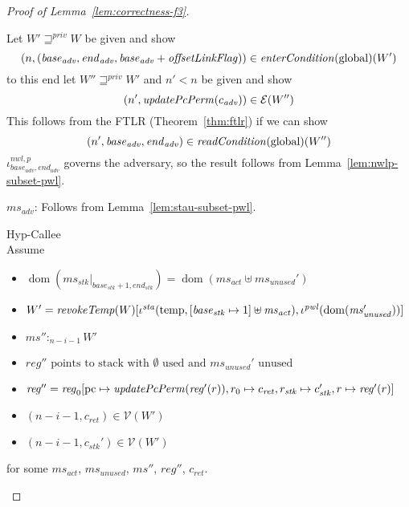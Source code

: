 \documentclass[a4paper]{article}
\DeclareMathOperator{\dom}{dom}
\newcommand{\var}[1]{\mathit{#1}}
\newcommand{\hs}{\var{ms}}
\newcommand{\ms}{\hs}
\newcommand{\pcreg}{\mathrm{pc}}
\newcommand{\start}{\var{base}}
\newcommand{\addrend}{\var{end}}
\newcommand{\reg}{\var{reg}}
\newcommand{\heap}{\var{mem}}
\newcommand{\adv}{\var{adv}}
\newcommand{\stk}{\var{stk}}
\newcommand{\nwl}{\var{nwl}}
\newcommand{\pwl}{\var{pwl}}
\newcommand{\sta}{\var{sta}}
\newcommand{\olf}{\var{offsetLinkFlag}}
\newcommand{\plainfun}[2]{
  \ifthenelse{\equal{#2}{}}
  {\mathit{#1}}
  {\mathit{#1}(#2)}
}
\newcommand{\updatePcPerm}[1]{\plainfun{updatePcPerm}{#1}}
\newcommand{\readCond}[1]{\plainfun{readCondition}{#1}}
\newcommand{\entryCond}[1]{\plainfun{enterCondition}{#1}}
\newcommand{\revokeTemp}[1]{\plainfun{revokeTemp}{#1}}
\newcommand{\futurestr}{\mathbin{\sqsupseteq}^{\var{priv}}}
\newcommand{\heapSat}[3][\heap]{#1 :_{#2} #3}
\newcommand{\memSat}[3][n]{\heapSat[#2]{#1}{#3}}
\newcommand{\asmType}{\plaindom{AsmType}}
\newcommand{\plaindom}[1]{\mathrm{#1}}
\newcommand{\intr}[2]{\mathcal{#1}}
\newcommand{\valueintr}[1]{\intr{V}{#1}}
\newcommand{\exprintr}[1]{\intr{E}{#1}}
\newcommand{\stdvr}{\valueintr{\asmType}}
\newcommand{\stder}{\exprintr{\asmType}}
\newcommand{\npair}[2][n]{\left(#1,#2 \right)}
\newcommand{\plainperm}[1]{\mathrm{#1}}
\newcommand{\glob}{\plainperm{global}}
\newcommand{\plainview}[1]{\mathrm{#1}}
\newcommand{\temp}{\plainview{temp}}
\begin{document}
\begin{proof}[Proof of Lemma~\ref{lem:correctness-f3}]
\begin{enumproof}
\begin{enumproof}
\begin{enumproof}
            Let $W' \futurestr W$ be given and show
            \[
              \npair{(\start_\adv,\addrend_\adv,\start_\adv+\olf)} \in \entryCond{}(\glob)(W')
            \]
            to this end let $W'' \futurestr W'$ and $n' < n$ be given and show
            \[
              \npair[n']{\updatePcPerm{c_\adv}} \in \stder(W'')
            \]
            This follows from the FTLR (Theorem~\ref{thm:ftlr}) if we can show
            \[
              \npair[n']{\start_\adv,\addrend_\adv} \in \readCond{}(\glob)(W'')
            \]
            $\iota^{\nwl,p}_{\start_\adv,\addrend_\adv}$ governs the adversary, so the result follows from Lemma~\ref{lem:nwlp-subset-pwl}.
          \end{enumproof}
      \item $\ms_\adv$:
        Follows from Lemma~\ref{lem:stau-subset-pwl}.
    \end{enumproof}
  \item Hyp-Callee \\
    Assume
    \begin{itemize}
    \item $\dom(\ms_\stk |_{\start_\stk+1,\addrend_\stk}) = \dom(\ms_{\mathit{act}} \uplus \ms_{\mathit{unused}}')$
    \item $W' = \revokeTemp{W}[\iota^{\sta}(\temp,[\start_\stk \mapsto 1]\uplus\ms_{\mathit{act}}),\iota^{\pwl}(\dom(\ms_{\mathit{unused}}'))]$
    \item $\memSat[n-i-1]{\ms''}{W'}$
    \item $\reg'' \text{ points to stack with $\emptyset$ used and $\ms_{\mathit{unused}}'$ unused}$
    \item $\reg''= \reg_0[\pcreg\mapsto\updatePcPerm{\reg'(r)},r_0 \mapsto c_{\mathit{ret}}, r_\stk \mapsto c_\stk', r \mapsto \reg'(r)]$ 
    \item $\npair[n-i-1]{c_{\mathit{ret}}} \in \stdvr(W')$
    \item $\npair[n-i-1]{c_\stk'} \in \stdvr(W')$
    \end{itemize}
    for some $\ms_{\mathit{act}}$, $\ms_{\mathit{unused}}$, $\ms''$, $\reg''$, $c_{\mathit{ret}}$.
    

\end{enumproof}
\end{proof}
\end{document}
